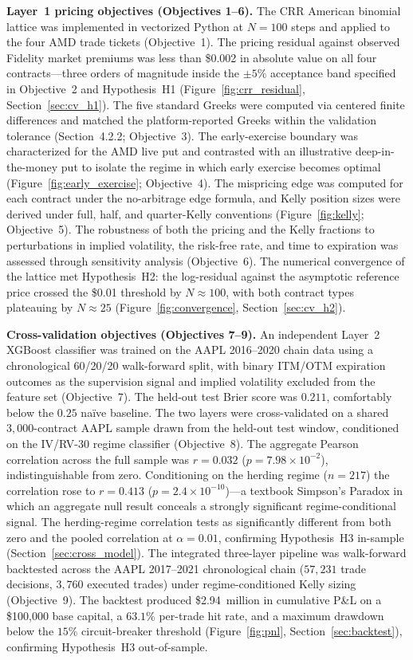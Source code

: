 \documentclass[12pt, letterpaper]{article}
\begin{document}
\textbf{Layer~1 pricing objectives (Objectives 1--6).} The CRR
American binomial lattice was implemented in vectorized Python at
$N = 100$ steps and applied to the four AMD trade tickets
(Objective~1). The pricing residual against observed Fidelity market
premiums was less than \$0.002 in absolute value on all four
contracts---three orders of magnitude inside the $\pm 5\%$ acceptance
band specified in Objective~2 and Hypothesis~H1
(Figure~\ref{fig:crr_residual}, Section~\ref{sec:cv_h1}). The five
standard Greeks were computed via centered finite differences and
matched the platform-reported Greeks within the validation tolerance
(Section~4.2.2; Objective~3). The early-exercise boundary was
characterized for the AMD live put and contrasted with an illustrative
deep-in-the-money put to isolate the regime in which early exercise
becomes optimal (Figure~\ref{fig:early_exercise}; Objective~4). The
mispricing edge was computed for each contract under the
no-arbitrage edge formula, and Kelly position sizes were derived
under full, half, and quarter-Kelly conventions
(Figure~\ref{fig:kelly}; Objective~5). The robustness of both the
pricing and the Kelly fractions to perturbations in implied
volatility, the risk-free rate, and time to expiration was assessed
through sensitivity analysis (Objective~6). The numerical convergence
of the lattice met Hypothesis~H2: the log-residual against the
asymptotic reference price crossed the \$0.01 threshold by
$N \approx 100$, with both contract types plateauing by $N \approx 25$
(Figure~\ref{fig:convergence}, Section~\ref{sec:cv_h2}).

\newpage
\textbf{Cross-validation objectives (Objectives 7--9).} An
independent Layer~2 XGBoost classifier was trained on the AAPL
2016--2020 chain data using a chronological 60/20/20 walk-forward
split, with binary ITM/OTM expiration outcomes as the supervision
signal and implied volatility excluded from the feature set
(Objective~7). The held-out test Brier score was $0.211$,
comfortably below the $0.25$ naïve baseline. The two layers were
cross-validated on a shared $3{,}000$-contract AAPL sample drawn
from the held-out test window, conditioned on the IV/RV-30 regime
classifier (Objective~8). The aggregate Pearson correlation across
the full sample was $r = 0.032$ ($p = 7.98 \times 10^{-2}$),
indistinguishable from zero. Conditioning on the herding regime
($n = 217$) the correlation rose to $r = 0.413$
($p = 2.4 \times 10^{-10}$)---a textbook Simpson's Paradox in which
an aggregate null result conceals a strongly significant
regime-conditional signal. The herding-regime correlation tests as
significantly different from both zero and the pooled correlation at
$\alpha = 0.01$, confirming Hypothesis~H3 in-sample
(Section~\ref{sec:cross_model}). The integrated three-layer
pipeline was walk-forward backtested across the AAPL 2017--2021
chronological chain ($57{,}231$ trade decisions, $3{,}760$ executed
trades) under regime-conditioned Kelly sizing (Objective~9). The
backtest produced \$2.94~million in cumulative P\&L on a \$100{,}000
base capital, a $63.1\%$ per-trade hit rate, and a maximum drawdown
below the $15\%$ circuit-breaker threshold
(Figure~\ref{fig:pnl}, Section~\ref{sec:backtest}), confirming
Hypothesis~H3 out-of-sample.
\end{document}
